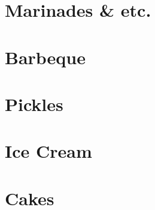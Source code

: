 \documentclass{family_cookbook}
\begin{document}
\chapter{Marinades \& etc.}
\minitoc%
\clearpage







\chapter{Barbeque}
\minitoc%
\clearpage




\chapter{Pickles}
\minitoc%
\clearpage

{%
	\let\section\subsection%
	\let\subsection\subsubsection%
	
	
	
}


\chapter{Ice Cream}
\minitoc%
\clearpage



\chapter{Cakes}
\minitoc%
\clearpage









%



\end{document}
